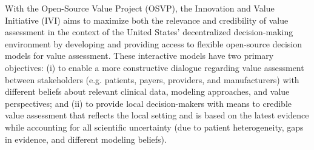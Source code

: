 \documentclass[11pt,final,fleqn]{article}\usepackage[]{graphicx}\usepackage[]{color}
\theoremstyle{plain}
\begin{document}
With the Open-Source Value Project (OSVP), the Innovation and Value Initiative (IVI) aims to maximize both the relevance and credibility of value assessment in the context of the United States' decentralized decision-making environment by developing and providing access to flexible open-source decision models for value assessment. These interactive models have two primary objectives: (i) to enable a more constructive dialogue regarding value assessment between stakeholders (e.g. patients, payers, providers, and manufacturers) with different beliefs about relevant clinical data, modeling approaches, and value perspectives; and (ii) to provide local decision-makers with means to credible value assessment that reflects the local setting and is based on the latest evidence while accounting for all scientific uncertainty (due to patient heterogeneity, gaps in evidence, and different modeling beliefs). 
\end{document}
